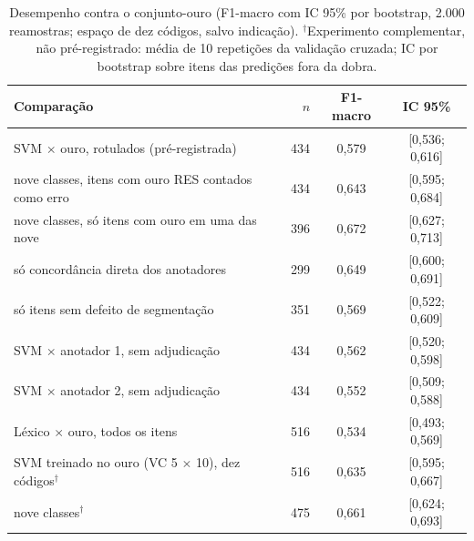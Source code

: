 \documentclass[fleqn,10pt]{SelfArx}
\begin{document}
\begin{table}[ht]
\caption{Desempenho contra o conjunto-ouro (F1-macro com IC 95\% por bootstrap, 2.000 reamostras; espaço de dez códigos, salvo indicação). $^{\dagger}$Experimento complementar, não pré-registrado: média de 10 repetições da validação cruzada; IC por bootstrap sobre itens das predições fora da dobra.}
\label{tab:ouro}
\centering
\small
\begin{tabular}{lrcc}
\toprule
Comparação & $n$ & F1-macro & IC 95\% \\
\midrule
SVM $\times$ ouro, rotulados (pré-registrada) & 434 & 0,579 & [0,536; 0,616] \\
\quad nove classes, itens com ouro RES contados como erro & 434 & 0,643 & [0,595; 0,684] \\
\quad nove classes, só itens com ouro em uma das nove & 396 & 0,672 & [0,627; 0,713] \\
\quad só concordância direta dos anotadores & 299 & 0,649 & [0,600; 0,691] \\
\quad só itens sem defeito de segmentação & 351 & 0,569 & [0,522; 0,609] \\
SVM $\times$ anotador 1, sem adjudicação & 434 & 0,562 & [0,520; 0,598] \\
SVM $\times$ anotador 2, sem adjudicação & 434 & 0,552 & [0,509; 0,588] \\
Léxico $\times$ ouro, todos os itens & 516 & 0,534 & [0,493; 0,569] \\
\midrule
SVM treinado no ouro (VC 5 $\times$ 10), dez códigos$^{\dagger}$ & 516 & 0,635 & [0,595; 0,667] \\
\quad nove classes$^{\dagger}$ & 475 & 0,661 & [0,624; 0,693] \\
\bottomrule
\end{tabular}
\end{table}
\end{document}
